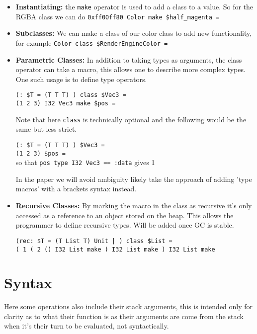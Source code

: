 \documentclass{article}
\begin{document}
\begin{itemize}
    \begin{itemize}
        \item \textbf{Instantiating:} the \texttt{make} operator is used to add a class to a value. So for the RGBA class we can do \texttt{0xff00ff80 Color make \$half\_magenta =}

        \item \textbf{Subclasses:} We can make a class of our color class to add new functionality, for example \texttt{Color class \$RenderEngineColor =}

        \item \textbf{Parametric Classes:} In addition to taking types as arguments, the class operator can take a macro, this allows one to describe more complex types. One such usage is to define type operators.

        \texttt{(: \$T = (T T T) ) class \$Vec3 =}\\
        \texttt{(1 2 3) I32 Vec3 make \$pos =}

        Note that here \texttt{class} is technically optional and the following would be the same but less strict.

        \texttt{(: \$T = (T T T) ) \$Vec3 =}\\
        \texttt{(1 2 3) \$pos =}\\
        so that \texttt{pos type I32 Vec3 == :data} gives 1

        In the paper we will avoid ambiguity likely take the approach of adding 'type macros' with a brackets syntax instead.

        \item \textbf{Recursive Classes:} By marking the macro in the class as recursive it's only accessed as a reference to an object stored on the heap. This allows the programmer to define recursive types. Will be added once GC is stable.

        \texttt{(rec: \$T = (T List T) Unit | ) class \$List =}\\
        \texttt{( 1 ( 2 () I32 List make ) I32 List make ) I32 List make}
    \end{itemize}
\end{itemize}

\section{Syntax}
Here some operations also include their stack arguments, this is intended only for clarity as to what their function is as their arguments are come from the stack when it's their turn to be evaluated, not syntactically.
\end{document}
